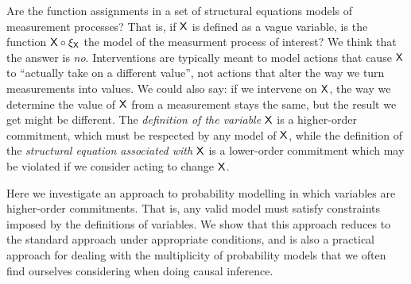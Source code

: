 Are the function assignments in a set of structural equations models of measurement processes? That is, if $\mathsf{X}$ is defined as a vague variable, is the function $\mathsf{X}\circ \xi_{\mathsf{X}}$ the model of the measurment process of interest? We think that the answer is \emph{no}. Interventions are typically meant to model actions that cause $\mathsf{X}$ to ``actually take on a different value'', not actions that alter the way we turn measurements into values. We could also say: if we intervene on $\mathsf{X}$, the way we determine the value of $\mathsf{X}$ from a measurement stays the same, but the result we get might be different. The \emph{definition of the variable} $\mathsf{X}$ is a higher-order commitment, which must be respected by any model of $\mathsf{X}$, while the definition of the \emph{structural equation associated with} $\mathsf{X}$ is a lower-order commitment which may be violated if we consider acting to change $\mathsf{X}$.

Here we investigate an approach to probability modelling in which variables are higher-order commitments. That is, any valid model must satisfy constraints imposed by the definitions of variables. We show that this approach reduces to the standard approach under appropriate conditions, and is also a practical approach for dealing with the multiplicity of probability models that we often find ourselves considering when doing causal inference.




